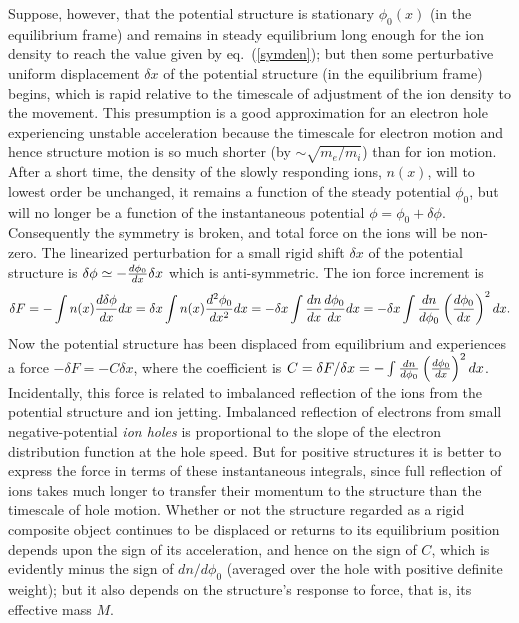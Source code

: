 \documentclass[pre]{revtex4-2}
\begin{document}
Suppose, however, that the potential structure is stationary
$\phi_0(x)$ (in the equilibrium frame) and remains in steady
equilibrium long enough for the ion density to reach the value given
by eq.\ (\ref{symden}); but then some perturbative uniform
displacement $\delta x$ of the potential structure (in the equilibrium
frame) begins, which is rapid relative to the timescale of adjustment
of the ion density to the movement. This presumption is a good
approximation for an electron hole experiencing unstable acceleration
because the timescale for electron motion and hence structure motion
is so much shorter (by $\sim \sqrt{m_e/m_i}$) than for ion
motion. After a short time, the density of the slowly responding ions,
$n(x)$, will to lowest order be unchanged, it remains a function of
the steady potential $\phi_0$, but will no longer be a function of the
instantaneous potential $\phi=\phi_0+\delta\phi$. Consequently the
symmetry is broken, and total force on the ions will be non-zero.
The linearized perturbation for a small rigid shift $\delta x$ of the potential
structure is
$\delta\phi\simeq-{d\phi_0\over dx}\delta x$ which is
anti-symmetric. The ion force increment is
\begin{equation}
  \delta F = -\int n(x) {d\delta\phi\over dx} dx 
  =\delta x \int n(x) {d^2\phi_0\over dx^2} dx 
  =-\delta x \int {dn\over dx} {d\phi_0\over dx} dx
  =-\delta x \int{dn\over d\phi_0}\left(d\phi_0 \over dx\right)^2 dx.
\end{equation}
Now the potential structure has been displaced from equilibrium and
experiences a force $-\delta F= -C \delta x$, where the coefficient is
$C=\delta F/\delta x=-\int{dn\over d\phi_0}\left(d\phi_0 \over
  dx\right)^2 dx$. Incidentally, this force is related to imbalanced
reflection of the ions from the potential structure and ion
jetting. Imbalanced reflection of electrons from small
negative-potential \emph{ion holes} is proportional to the slope of the
electron distribution function at the hole speed\cite{Dupree1983}. But
for positive structures it is better to express the force in terms of
these instantaneous integrals, since full reflection of ions takes
much longer to transfer their momentum to the structure than the
timescale of hole motion. Whether or not the structure regarded as a
rigid composite object continues to be displaced or returns to its
equilibrium position depends upon the sign of its acceleration, and
hence on the sign of $C$, which is evidently minus the sign of
$dn/d\phi_0$ (averaged over the hole with positive definite weight);
but it also depends on the structure's response to force, that is, its
effective mass $M$.
\end{document}
